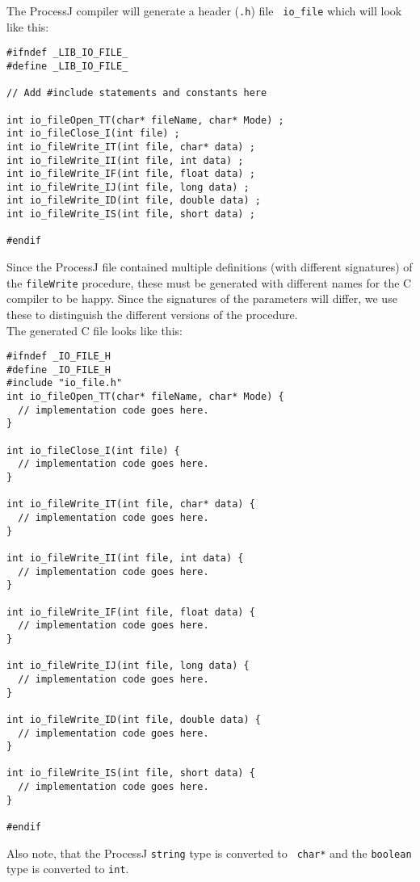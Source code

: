\documentclass[pdflatex,11pt,letter]{article}
\begin{document}
\noindent
The ProcessJ compiler will generate a header ({\tt .h}) file {\tt
  io\_file} which will look like this:


\begin{verbatim}
#ifndef _LIB_IO_FILE_
#define _LIB_IO_FILE_

// Add #include statements and constants here

int io_fileOpen_TT(char* fileName, char* Mode) ;
int io_fileClose_I(int file) ;
int io_fileWrite_IT(int file, char* data) ;
int io_fileWrite_II(int file, int data) ;
int io_fileWrite_IF(int file, float data) ;
int io_fileWrite_IJ(int file, long data) ;
int io_fileWrite_ID(int file, double data) ;
int io_fileWrite_IS(int file, short data) ;

#endif
\end{verbatim}

\noindent
Since the ProcessJ file contained multiple definitions (with different
signatures) of the {\tt fileWrite} procedure, these must be generated
with different names for the C compiler to be happy. Since the
signatures of the parameters will differ, we use these to distinguish
the different versions of the procedure.\\

\noindent
The generated C file looks like this:

\begin{verbatim}
#ifndef _IO_FILE_H
#define _IO_FILE_H
#include "io_file.h"
int io_fileOpen_TT(char* fileName, char* Mode) {
  // implementation code goes here.
}

int io_fileClose_I(int file) {
  // implementation code goes here.
}

int io_fileWrite_IT(int file, char* data) {
  // implementation code goes here.
}

int io_fileWrite_II(int file, int data) {
  // implementation code goes here.
}

int io_fileWrite_IF(int file, float data) {
  // implementation code goes here.
}

int io_fileWrite_IJ(int file, long data) {
  // implementation code goes here.
}

int io_fileWrite_ID(int file, double data) {
  // implementation code goes here.
}

int io_fileWrite_IS(int file, short data) {
  // implementation code goes here.
}

#endif
\end{verbatim}

\noindent
Also note, that the ProcessJ {\tt string} type is converted to {\tt
  char*} and the {\tt boolean} type is converted to {\tt int}.\\
\end{document}
